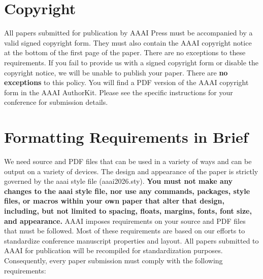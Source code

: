 \documentclass[letterpaper]{article} %
\begin{document}
\section{Copyright}\label{copyright}

All papers submitted for publication by AAAI Press must be accompanied
by a valid signed copyright form. They must also contain the AAAI
copyright notice at the bottom of the first page of the paper. There are
no exceptions to these requirements. If you fail to provide us with a
signed copyright form or disable the copyright notice, we will be unable
to publish your paper. There are \textbf{no exceptions} to this policy.
You will find a PDF version of the AAAI copyright form in the AAAI
AuthorKit. Please see the specific instructions for your conference for
submission details.

\section{Formatting Requirements in
Brief}\label{formatting-requirements-in-brief}

We need source and PDF files that can be used in a variety of ways and
can be output on a variety of devices. The design and appearance of the
paper is strictly governed by the aaai style file (aaai2026.sty).
\textbf{You must not make any changes to the aaai style file, nor use
any commands, packages, style files, or macros within your own paper
that alter that design, including, but not limited to spacing, floats,
margins, fonts, font size, and appearance.} AAAI imposes requirements on
your source and PDF files that must be followed. Most of these
requirements are based on our efforts to standardize conference
manuscript properties and layout. All papers submitted to AAAI for
publication will be recompiled for standardization purposes.
Consequently, every paper submission must comply with the following
requirements:
\end{document}
